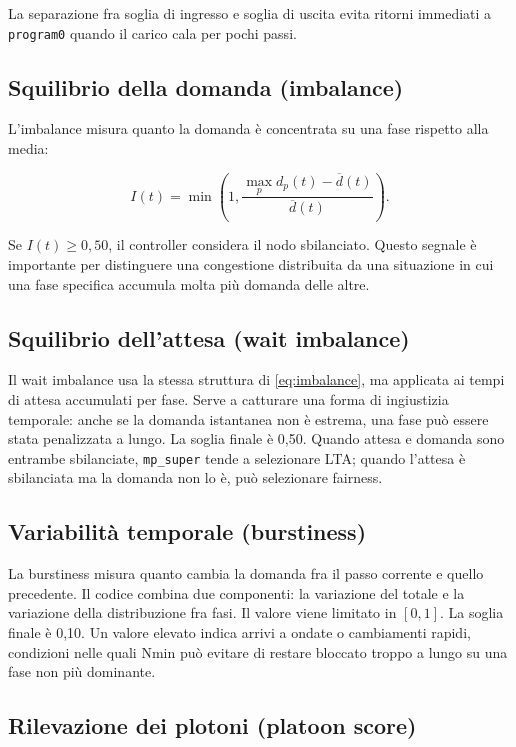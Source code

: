 \documentclass[12pt,a4paper,oneside]{report}
\numberwithin{equation}{chapter}
\begin{document}
La separazione fra soglia di ingresso e soglia di uscita evita ritorni
immediati a \texttt{program0} quando il carico cala per pochi passi.

\subsection{Squilibrio della domanda (imbalance)}

L'imbalance misura quanto la domanda è concentrata su una fase rispetto alla
media:

\begin{equation}
    I(t)=\min\left(1,\frac{\max_p d_p(t)-\overline{d}(t)}
    {\overline{d}(t)}\right).
    \label{eq:imbalance}
\end{equation}

Se \(I(t)\geq 0{,}50\), il controller considera il nodo sbilanciato. Questo
segnale è importante per distinguere una congestione distribuita da una
situazione in cui una fase specifica accumula molta più domanda delle altre.

\subsection{Squilibrio dell'attesa (wait imbalance)}

Il wait imbalance usa la stessa struttura di \cref{eq:imbalance}, ma applicata
ai tempi di attesa accumulati per fase. Serve a catturare una forma di
ingiustizia temporale: anche se la domanda istantanea non è estrema, una fase
può essere stata penalizzata a lungo. La soglia finale è 0,50. Quando attesa e
domanda sono entrambe sbilanciate, \texttt{mp\_super} tende a selezionare LTA;
quando l'attesa è sbilanciata ma la domanda non lo è, può selezionare fairness.

\subsection{Variabilità temporale (burstiness)}

La burstiness misura quanto cambia la domanda fra il passo corrente e quello
precedente. Il codice combina due componenti: la variazione del totale e la
variazione della distribuzione fra fasi. Il valore viene limitato in \([0,1]\).
La soglia finale è 0,10. Un valore elevato indica arrivi a ondate o cambiamenti
rapidi, condizioni nelle quali Nmin può evitare di restare bloccato troppo a
lungo su una fase non più dominante.

\subsection{Rilevazione dei plotoni (platoon score)}
\end{document}
